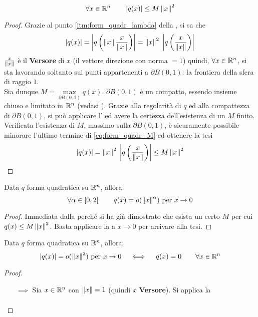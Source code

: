\begin{appendices}
\begin{proposition}
	\[\forall x \in \mathbb{R}^n \qquad \left|q(x)\right| \leq M \left\|x\right\|^2\]
	\begin{proof}
		Grazie al punto \ref{itm:form_quadr_lambda} della , si sa che
		\begin{equation}
			\label{eq:form_quadr_M}
			\left|q(x)\right| = \left|q \left( \left\|x\right\| \frac{x}{\left\|x\right\|} \right)\right| = \left\|x\right\|^2 \; \left|q \left( \frac{x}{\left\|x\right\|} \right)\right|
		\end{equation}
		$\frac{x}{\left\|x\right\|}$ è il \textbf{Versore} di $x$ (il vettore direzione con norma $= 1$) quindi, $\forall x \in \mathbb{R}^n$, si sta lavorando soltanto sui punti appartenenti a $\partial B(0,1)$: la frontiera della sfera di raggio $1$.\\
		Sia dunque $M = \max\limits_{\partial B(0,1)} q(x)$. $\partial B(0,1)$ è un compatto, essendo insieme chiuso e limitato in $\mathbb{R}^n$ (vedasi ). Grazie alla regolarità di $q$ ed alla compattezza di $\partial B(0,1)$, si può applicare l' ed avere la certezza dell'esistenza di un $M$ finito.\\
		Verificata l'esistenza di $M$, massimo sulla $\partial B(0,1)$, è sicuramente possibile minorare l'ultimo termine di \cref{eq:form_quadr_M} ed ottenere la tesi
		\[\left|q(x)\right| = \left\|x\right\|^2 \; \left|q \left( \frac{x}{\left\|x\right\|} \right)\right| \leq M \left\|x\right\|^2\]
	\end{proof}
\end{proposition}
\begin{corollary}
	Data $q$ forma quadratica su $\mathbb{R}^n$, allora:
	\[\forall \alpha \in \left[0,2\right[ \qquad q(x) = o(\left\|x\right\|^\alpha) \text{ per } x \to 0\]
	\begin{proof}
		Immediata dalla  perché si ha già dimostrato che esista un certo $M$ per cui $q(x) \leq M \left\|x\right\|^2$. Basta applicare la  a $x \to 0$ per arrivare alla tesi.
	\end{proof}
\end{corollary}
\begin{proposition}
	Data $q$ forma quadratica su $\mathbb{R}^n$, allora:
	\[\left|q(x)\right| = o(\left\|x\right\|^2) \text{ per } x \to 0 \quad \iff \quad q(x) = 0 \qquad \forall x \in \mathbb{R}^n\]
	\begin{proof}~
		\begin{itemize}
			\item[$\implies$] Sia $x \in \mathbb{R}^n$ con $\left\|x\right\| = 1$ (quindi $x$ \textbf{Versore}). Si applica la 
				\begin{align*}

\end{align*}
\end{itemize}
\end{proof}
\end{proposition}
\end{appendices}
